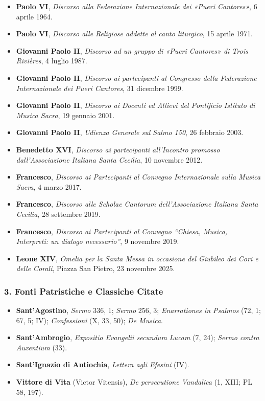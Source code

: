 \documentclass[12pt,a4paper]{article}
\begin{document}
	\begin{itemize}[leftmargin=*]
		\item \textbf{Paolo VI}, \emph{Discorso alla Federazione Internazionale dei «Pueri Cantores»}, 6 aprile 1964.
		\item \textbf{Paolo VI}, \emph{Discorso alle Religiose addette al canto liturgico}, 15 aprile 1971.
		\item \textbf{Giovanni Paolo II}, \emph{Discorso ad un gruppo di «Pueri Cantores» di Trois Rivières}, 4 luglio 1987.
		\item \textbf{Giovanni Paolo II}, \emph{Discorso ai partecipanti al Congresso della Federazione Internazionale dei Pueri Cantores}, 31 dicembre 1999.
		\item \textbf{Giovanni Paolo II}, \emph{Discorso ai Docenti ed Allievi del Pontificio Istituto di Musica Sacra}, 19 gennaio 2001.
		\item \textbf{Giovanni Paolo II}, \emph{Udienza Generale sul Salmo 150}, 26 febbraio 2003.
		\item \textbf{Benedetto XVI}, \emph{Discorso ai partecipanti all'Incontro promosso dall'Associazione Italiana Santa Cecilia}, 10 novembre 2012.
		\item \textbf{Francesco}, \emph{Discorso ai Partecipanti al Convegno Internazionale sulla Musica Sacra}, 4 marzo 2017.
		\item \textbf{Francesco}, \emph{Discorso alle Scholae Cantorum dell'Associazione Italiana Santa Cecilia}, 28 settembre 2019.
		\item \textbf{Francesco}, \emph{Discorso ai Partecipanti al Convegno ``Chiesa, Musica, Interpreti: un dialogo necessario''}, 9 novembre 2019.
		\item \textbf{Leone XIV}, \emph{Omelia per la Santa Messa in occasione del Giubileo dei Cori e delle Corali}, Piazza San Pietro, 23 novembre 2025.
	\end{itemize}
	
	\subsubsection{3. Fonti Patristiche e Classiche Citate}\label{fonti-patristiche-e-classiche-citate}
	
	\begin{itemize}[leftmargin=*]
		\item \textbf{Sant'Agostino}, \emph{Sermo} 336, 1; \emph{Sermo} 256, 3; \emph{Enarrationes in Psalmos} (72, 1; 67, 5; IV); \emph{Confessioni} (X, 33, 50); \emph{De Musica}.
		\item \textbf{Sant'Ambrogio}, \emph{Expositio Evangelii secundum Lucam} (7, 24); \emph{Sermo contra Auxentium} (33).
		\item \textbf{Sant'Ignazio di Antiochia}, \emph{Lettera agli Efesini} (IV).
		\item \textbf{Vittore di Vita} (Victor Vitensis), \emph{De persecutione Vandalica} (1, XIII; PL 58, 197).
	\end{itemize}
	
\end{document}
